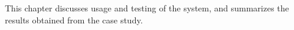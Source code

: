 This chapter discusses usage and testing of the system, and summarizes the results obtained from the case study.